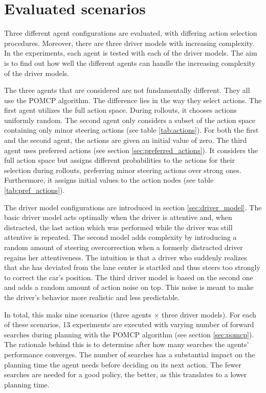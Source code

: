 
\section{Evaluated scenarios}
\label{sec:scenarios}

Three different agent configurations are evaluated, with differing action selection procedures. Moreover, there are three driver models with increasing complexity. In the experiments, each agent is tested with each of the driver models. The aim is to find out how well the different agents can handle the increasing complexity of the driver models.

The three agents that are considered are not fundamentally different. They all use the POMCP algorithm. The difference lies in the way they select actions. The first agent utilizes the full action space. During rollouts, it chooses actions uniformly random. The second agent only considers a subset of the action space containing only minor steering actions (see table \ref{tab:actions}). For both the first and the second agent, the actions are given an initial value of zero. The third agent uses preferred actions (see section \ref{sec:preferred_actions}). It considers the full action space but assigns different probabilities to the actions for their selection during rollouts, preferring minor steering actions over strong ones. Furthermore, it assigns initial values to the action nodes (see table \ref{tab:pref_actions}).

The driver model configurations are introduced in section \ref{sec:driver_model}. The basic driver model acts optimally when the driver is attentive and, when distracted, the last action which was performed while the driver was still attentive is repeated. The second model adds complexity by introducing a random amount of steering overcorrection when a formerly distracted driver regains her attentiveness. The intuition is that  a driver who suddenly realizes that she has deviated from the lane center is startled and thus steers too strongly to correct the car's position. The third driver model is based on the second one and adds a random amount of action noise on top. This noise is meant to make the driver's behavior more realistic and less predictable.

In total, this maks nine scenarios (three agents $\times$ three driver models). For each of these scenarios, 13 experiments are executed with varying number of forward searches during planning with the POMCP algorithm (see section \ref{sec:pomcp}). The rationale behind this is to determine after how many searches the agents' performance converges. The number of searches has a substantial impact on the planning time the agent needs before deciding on its next action. The fewer searches are needed for a good policy, the better, as this translates to a lower planning time.

